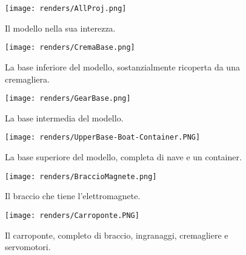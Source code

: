 \begin{figure}[!hbtp]\centering
    \caption{Il modello nella sua interezza.}\label{fig:allproj}
    \texttt{[image: renders/AllProj.png]}
\end{figure}
\begin{figure}[!hbtp]\centering
    \caption{La base inferiore del modello, sostanzialmente ricoperta da una cremagliera.}\label{fig:cremabase}
    \texttt{[image: renders/CremaBase.png]}
\end{figure}
\begin{figure}[!hbtp]\centering
    \caption{La base intermedia del modello.}\label{fig:gearbase}
    \texttt{[image: renders/GearBase.png]}
\end{figure}
\begin{figure}[!hbtp]\centering
    \caption{La base superiore del modello, completa di nave e un container.}\label{fig:upperbase}
    \texttt{[image: renders/UpperBase-Boat-Container.PNG]}
\end{figure}
\begin{figure}[!hbtp]\centering
    \caption{Il braccio che tiene l'elettromagnete.}\label{fig:magnetarm}
    \texttt{[image: renders/BraccioMagnete.png]}
\end{figure}
\begin{figure}[!hbtp]\centering
    \caption{Il carroponte, completo di braccio, ingranaggi, cremagliere e servomotori.}\label{fig:lowerbase}
    \texttt{[image: renders/Carroponte.PNG]}
\end{figure}

% 
% 
% 

